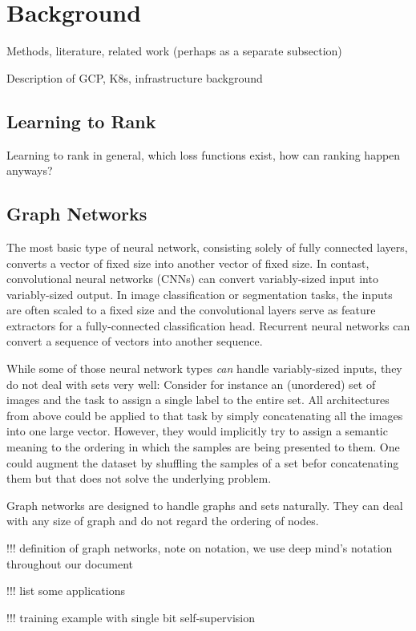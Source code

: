 \section{Background}

Methods, literature, related work (perhaps as a separate subsection)

Description of GCP, K8s, infrastructure background

\subsection{Learning to Rank}
Learning to rank in general, which loss functions exist, how can ranking happen anyways?

\subsection{Graph Networks}
The most basic type of neural network, consisting solely of fully connected layers, converts a vector of fixed size into another vector of fixed size.
In contast, convolutional neural networks (CNNs) can convert variably-sized input into variably-sized output. In image classification or segmentation tasks, the inputs are often scaled to a fixed size and the convolutional layers serve as feature extractors for a fully-connected classification head.
Recurrent neural networks can convert a sequence of vectors into another sequence.

While some of those neural network types \textit{can} handle variably-sized inputs, they do not deal with sets very well: Consider for instance an (unordered) set of images and the task to assign a single label to the entire set. All architectures from above could be applied to that task by simply concatenating all the images into one large vector. However, they would implicitly try to assign a semantic meaning to the ordering in which the samples are being presented to them. One could augment the dataset by shuffling the samples of a set befor concatenating them but that does not solve the underlying problem.

Graph networks are designed to handle graphs and sets naturally. They can deal with any size of graph and do not regard the ordering of nodes.

!!! definition of graph networks, note on notation, we use deep mind's notation throughout our document

!!! list some applications

!!! training example with single bit self-supervision


